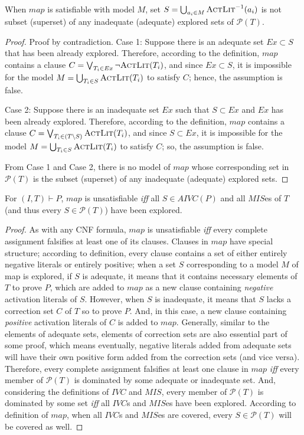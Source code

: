 \begin{lemma}
\label{lem:map:sound}
When $map$ is satisfiable with model $M$, set $S = \bigcup_{a_i \in M} \textsc{ActLit} ^{-1} (a_i)$ is not subset (superset) of any
inadequate (adequate) explored sets of $\mathcal{P}(T)$.
\end{lemma}
\begin{proof}
Proof by contradiction. Case 1: Suppose there is an adequate set $Ex \subset S$ that has been already explored. Therefore, according to the definition, $map$ contains a clause $C = \bigvee_{T_{i}\in Ex} \neg {\textsc{ActLit}(T_i)}$, and since $Ex \subset S$, it is impossible for the model $M = \bigcup_{T_i \in S} \textsc{ActLit} (T_i)$ to satisfy $C$; hence, the assumption is false.

Case 2: Suppose there is an inadequate set $Ex$ such that $S \subset Ex$ and $Ex$ has been already explored. Therefore, according to the definition, $map$ contains a clause $C = \bigvee_{T_{i}\in (T \setminus S)} \textsc{ActLit} (T_i)$, and since $S \subset Ex$, it is impossible for the model $M = \bigcup_{T_i \in S} \textsc{ActLit} (T_i)$ to satisfy $C$; so, the assumption is false.

From Case 1 and Case 2, there is no model of $map$ whose corresponding set in $\mathcal{P}(T)$ is the subset (superset) of any inadequate (adequate) explored sets.
\end{proof}


\begin{lemma}
\label{lem:map:comp}
For $(I, T) \vdash P$, $map$ is unsatisfiable \emph{iff} all $S \in AIVC(P)$ and all $MIS$es of $T$ (and thus every $S \in \mathcal{P}(T)$) have been explored.
\end{lemma}
\begin{proof}
As with any CNF formula, $map$ is unsatisfiable \emph{iff} every complete assignment falsifies at least one of its clauses. Clauses in $map$ have special structure;
according to definition, every clause contains a set of either entirely negative literals or entirely positive; when a set $S$ corresponding to a model $M$ of map is explored, if $S$ is adequate, it means that it contains necessary elements of $T$ to prove $P$, which
are added to $map$ as a new clause containing \emph{negative} activation literals of $S$. However, when
$S$ is inadequate, it means that $S$ lacks a correction set $C$ of $T$ so to prove $P$.
And, in this case, a new clause containing \emph{positive} activation literals of $C$ is added to $map$. Generally, similar to the elements of adequate sets, elements of correction sets are also essential part of some proof, which means eventually, negative literals added from adequate sets will have their own  positive form added from the correction sets (and vice versa).
Therefore, every complete assignment falsifies at least one clause in $map$ \emph{iff} every
member of $\mathcal{P}(T)$ is dominated by some adequate or inadequate set.
And, considering the definitions of $IVC$ and $MIS$,  every member of $\mathcal{P}(T)$ is dominated by some set \emph{iff} all $IVC$s and $MIS$es have been explored. According to definition of $map$, when all $IVC$s and $MIS$es are covered, every $S \in \mathcal{P}(T)$ will be covered as well.
\end{proof}

